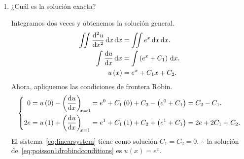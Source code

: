 \begin{problem}
\begin{enumerate}
      \item

            ¿Cuál es la solución exacta?

            \begin{solution}
                  Integramos dos veces y obtenemos la solución general.
                  \begin{align*}
                        \iint
                        \diff[2]{u}{x}
                        \dl x
                        \dl x           & =
                        \iint
                        e^{x}
                        \dl x
                        \dl x.              \\
                        \int
                        \diff{u}{x}
                        \dl x           & =
                        \int
                        \left(e^{x}+C_{1}\right)
                        \dl x.              \\
                        u\left(x\right) & =
                        e^{x}+C_{1}x+C_{2}.
                  \end{align*}
                  Ahora, apliquemos las condiciones de frontera Robin.
                  \begin{equation}\label{eq:linearsystem}
                        \left\{
                        \begin{aligned}
                              0
                               & =
                              u\left(0\right)-
                              \diff{u}{x}[x=0]=
                              e^{0}+C_{1}\left(0\right)+C_{2}-
                              \left(e^{0}+C_{1}\right)=
                              C_{2}-C_{1}. \\
                              2e
                               & =
                              u\left(1\right)+
                              \diff{u}{x}[x=1]=
                              e^{1}+C_{1}\left(1\right)+C_{2}+
                              \left(e^{1}+C_{1}\right)=
                              2e+2C_{1}+C_{2}.
                        \end{aligned}
                        \right.
                  \end{equation}
                  El sistema~\eqref{eq:linearsystem} tiene como solución
                  $C_{1}=C_{2}=0$.
                  $\therefore$ la solución
                  de~\eqref{eq:poisson1drobindconditions} es
                  $u\left(x\right)=e^{x}$.
                  \noQED
            \end{solution}
\end{enumerate}


\end{problem}
